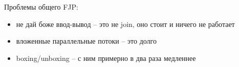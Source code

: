 Проблемы общего FJP:
\begin{itemize}
\item
	не дай боже ввод-вывод -- это не join, оно стоит и ничего не работает
\item
	вложенные параллельные потоки -- это %
	долго
\item
	boxing/unboxing -- с ним примерно в два раза медленнее%
\end{itemize}

